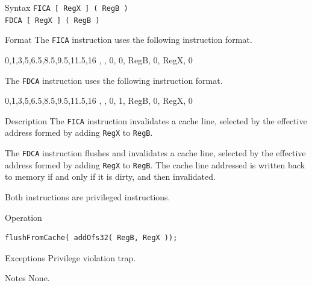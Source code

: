 %
%
\pagebreak
{}

\begin{iPageDescEntry}{Syntax}
	\texttt{FICA [ RegX ] ( RegB )} \\
	\texttt{FDCA [ RegX ] ( RegB )}
\end{iPageDescEntry}

\begin{iPageDescEntry}{Format}
 	The \texttt{FICA} instruction uses the following instruction format. \\
    \begin{flushleft}
    \drawInstrFormat
        {0,1,3,5,6.5,8.5,9.5,11.5,16}
        {\OpCodeGrpSYS, \OpCodePCA, 0, 0, RegB, 0, RegX, 0}
    \end{flushleft}
    The \texttt{FDCA} instruction uses the following instruction format. \\
    \begin{flushleft}
    \drawInstrFormat
        {0,1,3,5,6.5,8.5,9.5,11.5,16}
        {\OpCodeGrpSYS, \OpCodePCA, 0, 1, RegB, 0, RegX, 0}
    \end{flushleft}
\end{iPageDescEntry}

\begin{iPageDescEntry}{Description}        
    The \texttt{FICA} instruction invalidates a cache line, selected by the effective address formed by adding \texttt{RegX} to \texttt{RegB}. 
    
    The \texttt{FDCA} instruction flushes and invalidates a cache line, selected by the effective address formed by adding \texttt{RegX} to \texttt{RegB}. The cache line addressed is written back to memory if and only if it is dirty, and then invalidated. 

    Both instructions are privileged instructions.
\end{iPageDescEntry}

\begin{iPageDescOpEntry}{Operation}
\begin{lstlisting}[style=iPageOpStyle]
flushFromCache( addOfs32( RegB, RegX ));
\end{lstlisting}
\end{iPageDescOpEntry}

\begin{iPageDescEntry}{Exceptions}
    Privilege violation trap.
\end{iPageDescEntry}

\begin{iPageDescEntry}{Notes}
None.
\end{iPageDescEntry} 

